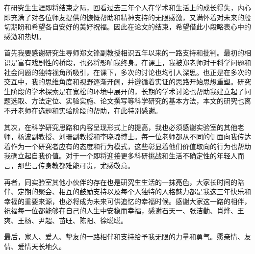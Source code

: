 
\thesisacknowledgement
在研究生生涯即将结束之际，回看过去三年个人在学术和生活上的成长得失，内心即充满了对各位师友提供的慷慨帮助和精神支持的无限感激，又满怀着对未来的殷切期盼和希望各自安好的美好祝福。因此在论文的结束，希望借此小段略表心中的感激和热切。

首先我要感谢研究生导师郑文锋副教授相识五年以来的一路支持和批判。最初的相识是富有戏剧性的桥段，也必将影响我终身。在课上，我被郑老师对于科学问题和社会问题的独特视角所吸引，在课下，多次的讨论也均引人深思。也正是在多次的交互中，我的思维角度和视野逐渐开阔，并遵循着实证的思路开始思想重塑。研究生阶段的学术探索是在宽松的环境中展开的，长期的学术讨论也帮助我建立起了问题选取、方法定位、实验实施、论文撰写等科学研究的基本方法，本文的研究也离不开老师在选题和实验阶段的帮助，在此特别感谢。

其次，在科学研究思路和内容呈现形式上的提高，我也必须感谢实验室的其他老师，杨波副教授、刘珊副教授和李晓璐博士。每一位老师都从不同的侧面向我传达着作为一个研究者应有的态度和行为模式，这些彰显着他们价值取向的行为也帮助我确立起自我价值。对于一个即将迎接更多科研挑战和生活不确定性的年轻人而言，那些言传身教都难能可贵，尤感敬意。

再者，同实验室其他小伙伴的存在也是研究生生活的一抹亮色，大家长时间的陪伴、定期的聚会、相互的鼓励支持以及每个人独特的人格魅力都是我这三年快乐和幸福的重要来源，也必将成为未来可供追忆的幸福时候。感谢大家这一路的相伴，祝福每一位都能够在自己的人生中安稳而幸福，感谢石天一、张洁勤、肖烨、王爽、王杨、尹超、苗旺、陈阳、徐聪聪。

最后，家人、爱人、挚友的一路相伴和支持给予我无限的力量和勇气。愿亲情、友情、爱情天长地久。

